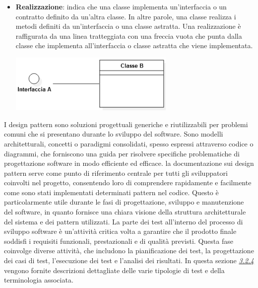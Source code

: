 \begin{itemize}
\begin{center}
		\end{center}
	\item \textbf{Realizzazione}:  indica che una classe implementa un'interfaccia o un contratto definito da un'altra classe. In altre parole, una classe realizza i metodi definiti da un'interfaccia o una classe astratta. Una realizzazione è raffigurata da una linea tratteggiata con una freccia vuota che punta dalla classe che implementa all'interfaccia o classe astratta che viene implementata.
	      \begin{center}
		      \includegraphics*[width=8cm]{../../../images/norme_di_progetto/realizzazioneClassi.png}
	      \end{center}
\end{itemize}

I design pattern  sono soluzioni progettuali generiche e riutilizzabili per problemi comuni che si presentano durante lo sviluppo del software. Sono modelli architetturali, concetti o paradigmi consolidati, spesso espressi attraverso codice o diagrammi, che forniscono una guida per risolvere specifiche problematiche di progettazione software in modo efficiente ed efficace. la documentazione sui design pattern serve come punto di riferimento centrale per tutti gli sviluppatori coinvolti nel progetto, consentendo loro di comprendere rapidamente e facilmente come sono stati implementati determinati pattern nel codice. Questo è particolarmente utile durante le fasi di progettazione, sviluppo e manutenzione del software, in quanto fornisce una chiara visione della struttura architetturale del sistema e dei pattern utilizzati.
La parte dei test all'interno del processo di sviluppo software è un'attività critica volta a garantire che il prodotto finale soddisfi i requisiti funzionali, prestazionali e di qualità previsti. Questa fase coinvolge diverse attività, che includono la pianificazione dei test, la progettazione dei casi di test, l'esecuzione dei test e l'analisi dei risultati. In questa sezione \hyperref[testing]{\textit{3.2.4}} vengono fornite descrizioni dettagliate delle varie tipologie di test e della terminologia associata.


